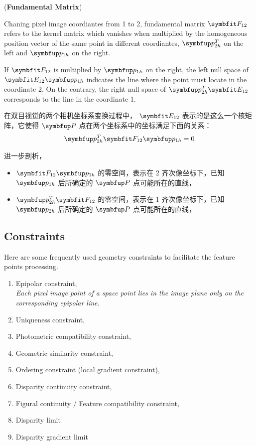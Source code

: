\begin{definition}
	(\textbf{Fundamental Matrix})
	
	Chaning pixel image coordiantes from 1 to 2, fundamental matrix $\Matr{F}_{12}$ refers to the kernel matrix which vanishes when multiplied by the homogeneous position vector of the same point in different coordiantes, $\Vect{p}_{2h}^T$ on the left and $\Vect{p}_{1h}$ on the right.
	
	If $\Matr{F}_{12}$ is multiplied by $\Vect{p}_{1h}$ on the right, the left null space of $\Matr{E}_{12}\Vect{p}_{1h}$ indicates the line where the point must locate in the coordinate 2. On the contrary, the right null space of $\Vect{p}_{2h}^T \Matr{E}_{12}$ corresponds to the line in the coordinate 1.

	在双目视觉的两个相机坐标系变换过程中， $\Matr{E}_{12}$ 表示的是这么一个核矩阵，它使得 $\Vect{P}$ 点在两个坐标系中的坐标满足下面的关系：
\begin{equation}
	\Vect{p}_{2h}^T\Matr{F}_{12}\Vect{p}_{1h}=0
\end{equation}

进一步剖析，
\begin{itemize}
	\item $\Matr{F}_{12}\Vect{p}_{1h}$ 的零空间，表示在 2 齐次像坐标下，已知$\Vect{p}_{1h}$ 后所确定的 $\Vect{P}$ 点可能所在的直线，
	\item $\Vect{p}_{2h}^T \Matr{F}_{12}$ 的零空间，表示在 1 齐次像坐标下，已知$\Vect{p}_{2h}$ 后所确定的 $\Vect{P}$ 点可能所在的直线，
\end{itemize}
\end{definition}

\subsection{Constraints}
Here are some frequently used geometry constraints to facilitate the feature points processing.
\begin{enumerate}
	\item Epipolar constraint,\\
	\textit{Each pixel image point of a space point lies in the image plane only on the corresponding epipolar line.}
	\item Uniqueness constraint,
	\item Photometric compatibility constraint,
	\item Geometric similarity constraint,
	\item Ordering constraint (local gradient constraint),
	\item Disparity continuity constraint,
	\item Figural continuity / Feature compatibility constraint,
	\item Disparity limit
	\item Disparity gradient limit
\end{enumerate}